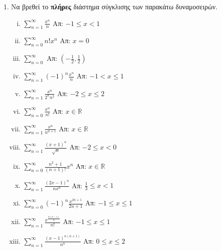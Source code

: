 




\everymath{\displaystyle}
\thispagestyle{empty}




\begin{center}
\end{center}

\vspace{\baselineskip}

\begin{enumerate}
  \item Να βρεθεί το \textbf{πλήρες} διάστημα σύγκλισης των παρακάτω δυναμοσειρών.

  \begin{enumerate}[i)]
    \item $\sum_{n=1}^{\infty} \frac{x^{n}}{n}$ \hfill Απ: $-1\leq x <1$
    \item $\sum_{n=0}^{\infty} n!x^{n}$ \hfill Απ: $x=0$
    \item $\sum_{n=0}^{\infty}$ \hfill  Απ: $(-\frac{1}{2},\frac{1}{2})$
    \item $\sum_{n=1}^{\infty} (-1)^{n}\frac{x^{n}}{n}$ \hfill Απ: $-1<x\leq 1$
    \item $\sum_{n=1}^{\infty} \frac{x^{n}}{2^{n}n^{2}}$ \hfill Απ: $-2\leq x \leq 2$
    \item $\sum_{n=0}^{\infty} \frac{x^{n}}{n!}$ \hfill Απ: $x\in \mathbb{R}$
    \item $\sum_{n=1}^{\infty} \frac{x^{n}}{n^{n+1}}$ \hfill Απ: $x\in \mathbb{R}$
    \item $\sum_{n=1}^{\infty} \frac{(x+1)^{n}}{\sqrt{n}}$ \hfill Απ: $-2\leq x <0$
    \item $\sum_{n=0}^{\infty} \frac{n^{2}+1}{(n+1)!}x^{n}$ \hfill Απ: $x\in\mathbb{R}$
    \item $\sum_{n=1}^{\infty} \frac{(2x-1)^{n}}{nx^{n}}$ \hfill Απ: $\frac{1}{3}\leq x<1$
    \item $\sum_{n=0}^{\infty} (-1)^{n}\frac{x^{2n+1}}{2n+1}$ \hfill Απ: $-1\leq x\leq 1$
    \item $\sum_{n=1}^{\infty} \frac{x^{\frac{n(n-1)}{2}}}{n!}$ \hfill Απ: $-1\leq x\leq 1$
    \item $\sum_{n=1}^{\infty} \frac{(x-1)^{n(n+1)}}{n^{n}}$ \hfill Απ: $0\leq x \leq 2$

  \end{enumerate}

\end{enumerate}


